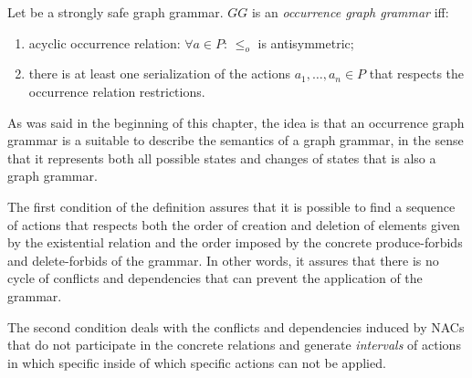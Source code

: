 \begin{definition} Let \doublyTypedGraphGrammarCore{} be a strongly safe graph grammar. $GG$ is an \emph{occurrence graph grammar} iff:

  \begin{enumerate}
    \item acyclic occurrence relation: $\forall a \in P$: $\leq_o$ is antisymmetric;
    \item there is at least one serialization of the actions $a_1,\ldots,a_n \in P$ that respects the occurrence relation restrictions.
  \end{enumerate}
\end{definition}

As was said in the beginning of this chapter, the idea is that an occurrence graph grammar is a suitable to describe the semantics of a graph grammar, in the sense that it represents both all possible states and changes of states that is also a graph grammar.

The first condition of the definition assures that it is possible to find a sequence of actions that respects both the order of creation and deletion of elements given by the existential relation and the order imposed by the concrete produce-forbids and delete-forbids of the grammar. In other words, it assures that there is no cycle of conflicts and dependencies that can prevent the application of the grammar.

The second condition deals with the conflicts and dependencies induced by NACs that do not participate in the concrete relations and generate \emph{intervals} of actions in which specific inside of which specific actions can not be applied.
